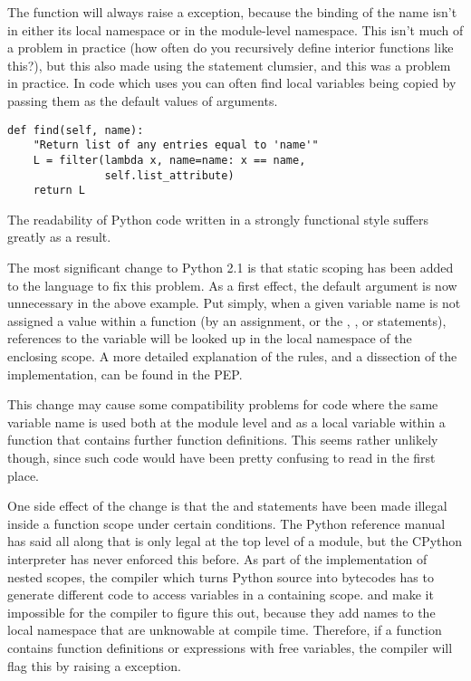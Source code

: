 \documentclass{howto}
\begin{document}
The function  will always raise a 
exception, because the binding of the name  isn't in either
its local namespace or in the module-level namespace.  This isn't much
of a problem in practice (how often do you recursively define interior
functions like this?), but this also made using the 
statement clumsier, and this was a problem in practice.  In code which
uses  you can often find local variables being copied
by passing them as the default values of arguments.

\begin{verbatim}
def find(self, name):
    "Return list of any entries equal to 'name'"
    L = filter(lambda x, name=name: x == name,
               self.list_attribute)
    return L
\end{verbatim}

The readability of Python code written in a strongly functional style
suffers greatly as a result.

The most significant change to Python 2.1 is that static scoping has
been added to the language to fix this problem.  As a first effect,
the  default argument is now unnecessary in the above
example.  Put simply, when a given variable name is not assigned a
value within a function (by an assignment, or the ,
, or  statements), references to the
variable will be looked up in the local namespace of the enclosing
scope.  A more detailed explanation of the rules, and a dissection of
the implementation, can be found in the PEP.

This change may cause some compatibility problems for code where the
same variable name is used both at the module level and as a local
variable within a function that contains further function definitions.
This seems rather unlikely though, since such code would have been
pretty confusing to read in the first place.  

One side effect of the change is that the  and  statements have been made illegal inside
a function scope under certain conditions.  The Python reference
manual has said all along that  is
only legal at the top level of a module, but the CPython interpreter
has never enforced this before.  As part of the implementation of
nested scopes, the compiler which turns Python source into bytecodes
has to generate different code to access variables in a containing
scope.   and  make it
impossible for the compiler to figure this out, because they add names
to the local namespace that are unknowable at compile time.
Therefore, if a function contains function definitions or
 expressions with free variables, the compiler will
flag this by raising a  exception.
\end{document}
